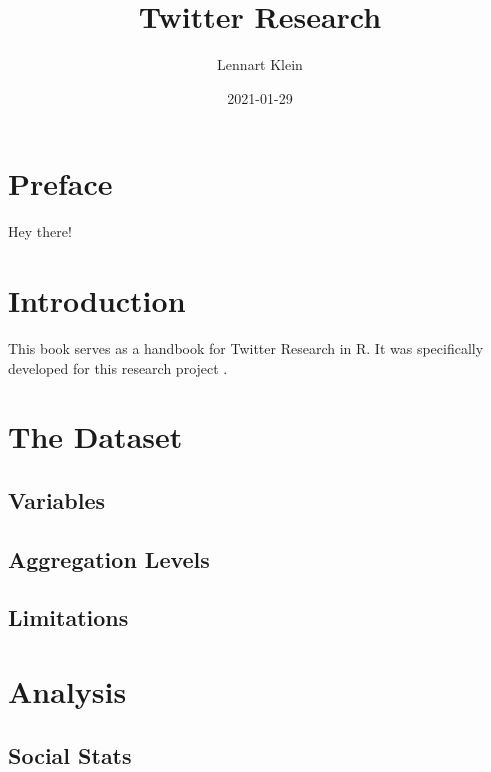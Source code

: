\documentclass[
]{book}
\title{Twitter Research}
\author{Lennart Klein}
\date{2021-01-29}
\begin{document}
\maketitle

{
\setcounter{tocdepth}{1}
\tableofcontents
}
\hypertarget{preface}{%
\chapter{Preface}\label{preface}}

Hey there!

\hypertarget{intro}{%
\chapter{Introduction}\label{intro}}

This book serves as a handbook for Twitter Research in R.
It was specifically developed for this research project .

\hypertarget{dataset}{%
\chapter{The Dataset}\label{dataset}}

\hypertarget{variables}{%
\section{Variables}\label{variables}}

\hypertarget{aggregation-levels}{%
\section{Aggregation Levels}\label{aggregation-levels}}

\hypertarget{limitations}{%
\section{Limitations}\label{limitations}}

\hypertarget{analysis}{%
\chapter{Analysis}\label{analysis}}

\hypertarget{social-stats}{%
\section{Social Stats}\label{social-stats}}
\end{document}
